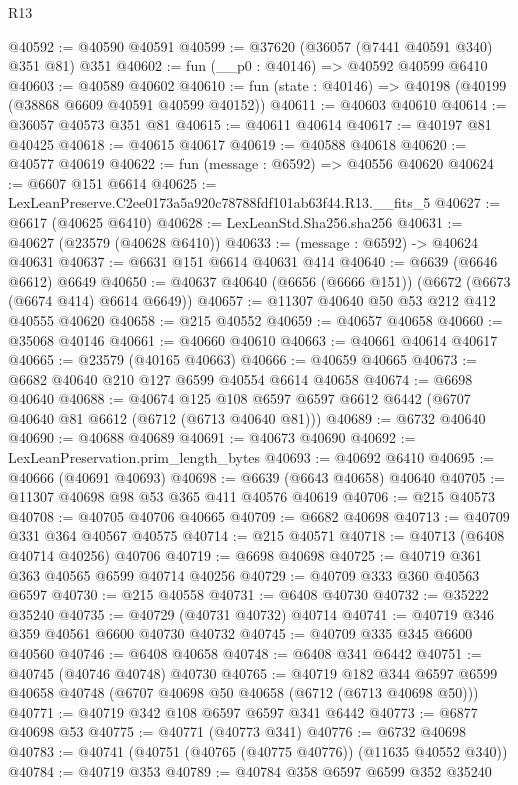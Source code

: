 \begin{lexlean}{R13}
\begin{coremodule}
@40592 := @40590 @40591
@40599 := @37620 (@36057 (@7441 @40591 @340) @351 @81) @351
@40602 := fun (__p0 : @40146) => @40592 @40599 @6410
@40603 := @40589 @40602
@40610 := fun (state : @40146) => @40198 (@40199 (@38868 @6609 @40591 @40599 @40152))
@40611 := @40603 @40610
@40614 := @36057 @40573 @351 @81
@40615 := @40611 @40614
@40617 := @40197 @81 @40425
@40618 := @40615 @40617
@40619 := @40588 @40618
@40620 := @40577 @40619
@40622 := fun (message : @6592) => @40556 @40620
@40624 := @6607 @151 @6614
@40625 := LexLeanPreserve.C2ee0173a5a920c78788fdf101ab63f44.R13.__fits_5
@40627 := @6617 (@40625 @6410)
@40628 := LexLeanStd.Sha256.sha256
@40631 := @40627 (@23579 (@40628 @6410))
@40633 := (message : @6592) -> @40624 @40631
@40637 := @6631 @151 @6614 @40631 @414
@40640 := @6639 (@6646 @6612) @6649
@40650 := @40637 @40640 (@6656 (@6666 @151)) (@6672 (@6673 (@6674 @414) @6614 @6649))
@40657 := @11307 @40640 @50 @53 @212 @412 @40555 @40620
@40658 := @215 @40552
@40659 := @40657 @40658
@40660 := @35068 @40146
@40661 := @40660 @40610
@40663 := @40661 @40614 @40617
@40665 := @23579 (@40165 @40663)
@40666 := @40659 @40665
@40673 := @6682 @40640 @210 @127 @6599 @40554 @6614 @40658
@40674 := @6698 @40640
@40688 := @40674
    @125
    @108
    @6597
    @6597
    @6612
    @6442
    (@6707 @40640 @81 @6612 (@6712 (@6713 @40640 @81)))
@40689 := @6732 @40640
@40690 := @40688 @40689
@40691 := @40673 @40690
@40692 := LexLeanPreservation.prim_length_bytes
@40693 := @40692 @6410
@40695 := @40666 (@40691 @40693)
@40698 := @6639 (@6643 @40658) @40640
@40705 := @11307 @40698 @98 @53 @365 @411 @40576 @40619
@40706 := @215 @40573
@40708 := @40705 @40706 @40665
@40709 := @6682 @40698
@40713 := @40709 @331 @364 @40567 @40575
@40714 := @215 @40571
@40718 := @40713 (@6408 @40714 @40256) @40706
@40719 := @6698 @40698
@40725 := @40719 @361 @363 @40565 @6599 @40714 @40256
@40729 := @40709 @333 @360 @40563 @6597
@40730 := @215 @40558
@40731 := @6408 @40730
@40732 := @35222 @35240
@40735 := @40729 (@40731 @40732) @40714
@40741 := @40719 @346 @359 @40561 @6600 @40730 @40732
@40745 := @40709 @335 @345 @6600 @40560
@40746 := @6408 @40658
@40748 := @6408 @341 @6442
@40751 := @40745 (@40746 @40748) @40730
@40765 := @40719
    @182
    @344
    @6597
    @6599
    @40658
    @40748
    (@6707 @40698 @50 @40658 (@6712 (@6713 @40698 @50)))
@40771 := @40719 @342 @108 @6597 @6597 @341 @6442
@40773 := @6877 @40698 @53
@40775 := @40771 (@40773 @341)
@40776 := @6732 @40698
@40783 := @40741 (@40751 (@40765 (@40775 @40776)) (@11635 @40552 @340))
@40784 := @40719 @353
@40789 := @40784 @358 @6597 @6599 @352 @35240

\end{coremodule}
\end{lexlean}
